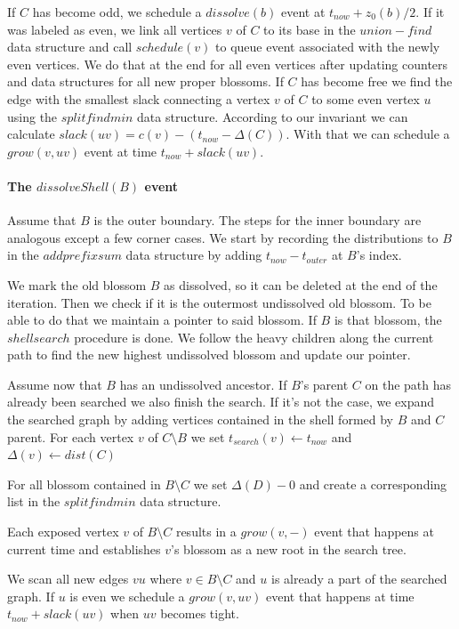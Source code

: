If $C$ has become odd, we schedule a $dissolve(b)$ event at $t_{now} + z_0(b) / 2$. If it was labeled as even, we link all vertices $v$ of $C$ to its base in the $union-find$ data structure and call $schedule(v)$ to queue event associated with the newly even vertices. We do that at the end for all even vertices after updating counters and data structures for all new proper blossoms. If $C$ has become free we find the edge with the smallest slack connecting a vertex $v$ of $C$ to some even vertex $u$ using the $splitfindmin$ data structure. According to our invariant we can calculate $slack(uv) = c(v) - (t_{now} - \Delta(C))$. With that we can schedule a $grow(v, uv)$ event at time $t_{now} + slack(uv)$. 

\paragraph*{The $dissolveShell(B)$ event}

Assume that $B$ is the outer boundary. The steps for the inner boundary are analogous except a few corner cases. We start by recording the distributions to $B$ in the $addprefixsum$ data structure by adding $t_{now} - t_{outer}$ at $B$'s index.

We mark the old blossom $B$ as dissolved, so it can be deleted at the end of the iteration. Then we check if it is the outermost undissolved old blossom. To be able to do that we maintain a pointer to said blossom. If $B$ is that blossom, the $shellsearch$ procedure is done. We follow the heavy children along the current path to find the new highest undissolved blossom and update our pointer.

Assume now that $B$ has an undissolved ancestor. If $B$'s parent $C$ on the path has already been searched we also finish the search. If it's not the case, we expand the searched graph by adding vertices contained in the shell formed by $B$ and $C$ parent. For each vertex $v$ of $C \setminus B$ we set $t_{search}(v) \gets t_{now}$ and $\Delta(v) \gets dist(C)$

For all blossom contained in $B \setminus C$ we set $\Delta(D) - 0$ and create a corresponding list in the $splitfindmin$ data structure.

Each exposed vertex $v$ of $B \setminus C$ results in a $grow(v, -)$ event that happens at current time and establishes $v$'s blossom as a new root in the search tree.

We scan all new edges $vu$ where $v \in B \setminus C$ and $u$ is already a part of the  searched graph. If $u$ is even we schedule a $grow(v, uv)$ event that happens at time $t_{now} + slack(uv)$ when $uv$ becomes tight. 

